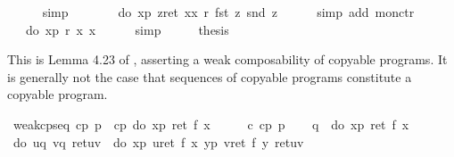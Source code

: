 \begin{isabellebody}
\ \ \ \ \isamarkupfalse%
\ simp\isanewline
\ \ \isamarkupfalse%
\ \isamarkupfalse%
\ {\isachardoublequote}{\isasymdots}\ {\isacharequal}\ do\ {\isacharbraceleft}x{\isasymleftarrow}p{\isacharsemicolon}\ z{\isasymleftarrow}ret\ {\isacharparenleft}x{\isacharcomma}x{\isacharparenright}{\isacharsemicolon}\ r\ {\isacharparenleft}fst\ z{\isacharparenright}\ {\isacharparenleft}snd\ z{\isacharparenright}{\isacharbraceright}{\isachardoublequote}\isanewline
\ \ \ \ \isamarkupfalse%
\ {\isacharparenleft}simp\ add{\isacharcolon}\ mon{\isacharunderscore}ctr{\isacharparenright}\isanewline
\ \ \isamarkupfalse%
\ \isamarkupfalse%
\ {\isachardoublequote}{\isasymdots}\ {\isacharequal}\ do\ {\isacharbraceleft}x{\isasymleftarrow}p{\isacharsemicolon}\ r\ x\ x{\isacharbraceright}{\isachardoublequote}\isanewline
\ \ \ \ \isamarkupfalse%
\ simp\isanewline
\ \ \isamarkupfalse%
\ \isamarkupfalse%
\ {\isacharquery}thesis\ \isamarkupfalse%
\isacommand{{\isachardot}}\isanewline
\isamarkupfalse%
\isamarkupfalse%
%
\begin{isamarkuptext}%
This is Lemma 4.23 of \cite{SchroederMossakowski:PDL}, asserting a weak composability of copyable programs.
  It is generally not the case that sequences of copyable programs constitute
  a copyable program.%
\end{isamarkuptext}%
\isamarkuptrue%
\ weak{\isacharunderscore}cp{\isacharunderscore}seq{\isacharcolon}\ {\isachardoublequote}cp\ p\ {\isasymLongrightarrow}\ cp\ {\isacharparenleft}do\ {\isacharbraceleft}x{\isasymleftarrow}p{\isacharsemicolon}\ ret\ {\isacharparenleft}f\ x{\isacharparenright}{\isacharbraceright}{\isacharparenright}{\isachardoublequote}\isanewline
\isamarkupfalse%
\ {\isacharminus}\isanewline
\ \ \isamarkupfalse%
\ c{\isacharcolon}\ {\isachardoublequote}cp\ p{\isachardoublequote}\isanewline
\ \ \isamarkupfalse%
\ {\isacharquery}q\ {\isacharequal}\ {\isachardoublequote}do\ {\isacharbraceleft}x{\isasymleftarrow}p{\isacharsemicolon}\ ret\ {\isacharparenleft}f\ x{\isacharparenright}{\isacharbraceright}{\isachardoublequote}\isanewline
\ \ \isamarkupfalse%
\ {\isachardoublequote}do\ {\isacharbraceleft}u{\isasymleftarrow}{\isacharquery}q{\isacharsemicolon}\ v{\isasymleftarrow}{\isacharquery}q{\isacharsemicolon}\ ret{\isacharparenleft}u{\isacharcomma}v{\isacharparenright}{\isacharbraceright}\ {\isacharequal}\ do\ {\isacharbraceleft}x{\isasymleftarrow}p{\isacharsemicolon}\ u{\isasymleftarrow}ret\ {\isacharparenleft}f\ x{\isacharparenright}{\isacharsemicolon}\ y{\isasymleftarrow}p{\isacharsemicolon}\ v{\isasymleftarrow}ret\ {\isacharparenleft}f\ y{\isacharparenright}{\isacharsemicolon}\ ret{\isacharparenleft}u{\isacharcomma}v{\isacharparenright}{\isacharbraceright}{\isachardoublequote}\isanewline

\end{isabellebody}
